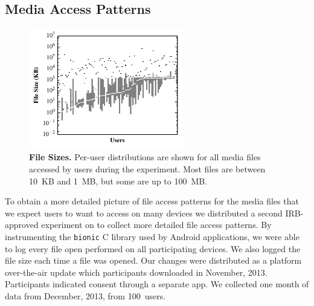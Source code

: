 \subsection{Media Access Patterns}

\begin{figure}

\vspace*{-0.4in}

\includegraphics[width=0.6\textwidth]{./figures/pocketlocker/FileSizeDistributionGraph.pdf}

\vspace*{-0.1in}

\caption{\small \textbf{File Sizes.} Per-user distributions are shown for all
media files accessed by users during the experiment. Most files
are between 10~KB and 1~MB, but some are up to 100~MB.}

\label{fig-motivation-totals}

\vspace*{-0.3in}

\end{figure}

To obtain a more detailed picture of file access patterns for the media files
that we expect users to want to access on many devices we distributed a
second IRB-approved experiment on \PhoneLab{} to collect more detailed file
access patterns. By instrumenting the \texttt{bionic} C library used by
Android applications, we were able to log every file open performed on all
participating devices. We also logged the file size each time a file was
opened. Our changes were distributed as a platform over-the-air update which
\PhoneLab{} participants downloaded in November, 2013. Participants indicated
consent through a separate app. We collected one month of data from December,
2013, from 100~users.

